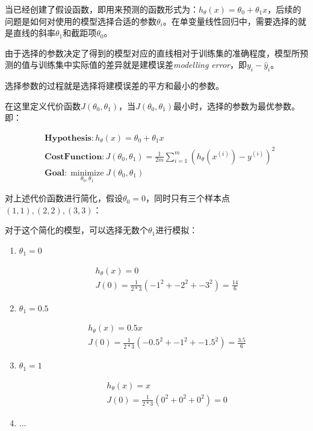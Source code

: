 \documentclass[12pt, a4paper]{article}
\begin{document}
当已经创建了假设函数，即用来预测的函数形式为：$h_\theta(x)=\theta_0 + \theta_1x$，后续的问题是如何对使用的模型选择合适的参数$\theta_i$。在单变量线性回归中，需要选择的就是直线的斜率$\theta_1$和截距项$\theta_0$。

由于选择的参数决定了得到的模型对应的直线相对于训练集的准确程度，模型所预测的值与训练集中实际值的差异就是建模误差\textit{modelling error}，即$y_i - \hat{y}_i$。

选择参数的过程就是选择将建模误差的平方和最小的参数。

在这里定义代价函数$J(\theta_0, \theta_1)$，当$J(\theta_0, \theta_1)$最小时，选择的参数为最优参数。即：

\begin{align*}
     & \mathbf{Hypothesis}: h_\theta(x)=\theta_0 + \theta_1x                                                   \\
     & \mathbf{Cost Function}: J(\theta_0, \theta_1) = \frac{1}{2m}\sum_{i=1}^{m}(h_\theta(x^{(i)})-y^{(i)})^2 \\
     & \mathbf{Goal}: \mathop{minimize}\limits_{\theta_0, \theta_1}J(\theta_0, \theta_1)
\end{align*}

对上述代价函数进行简化，假设$\theta_0=0$，同时只有三个样本点$(1,1),(2,2),(3,3)$：

对于这个简化的模型，可以选择无数个$\theta_1$进行模拟：

\begin{enumerate}
    \item 
          $\theta_1=0$
          
          \begin{align*}
               & h_\theta(x) = 0                                     \\
               & J(0) = \frac{1}{2*3}(-1^2+-2^2+-3^2) = \frac{14}{6}
          \end{align*}
          
    \item 
          $\theta_1=0.5$
          
          \begin{align*}
               & h_\theta(x) = 0.5x                                       \\
               & J(0) = \frac{1}{2*3}(-0.5^2+-1^2+-1.5^2) = \frac{3.5}{6}
          \end{align*}
          
    \item 
          $\theta_1=1$
          
          \begin{align*}
               & h_\theta(x) = x                       \\
               & J(0) = \frac{1}{2*3}(0^2+0^2+0^2) = 0
          \end{align*}
          
    \item 
          $\dots$
\end{enumerate}
\end{document}
